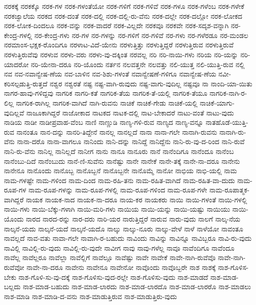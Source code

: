 {ನರಕಕ್ಕೆ
ನರಕಕ್ಕೊ
ನರಕ-ಗಳ
ನರಕ-ಗಳಂತೆಯೋ
ನರಕ-ಗಳಿಗೆ
ನರಕ-ಗಳಿವೆ
ನರಕ-ಗಳೂ
ನರಕ-ಗಳೆಂಬ
ನರಕ-ಗಳೇಕೆ
ನರಕಜ್ವಾಲೆಯ
ನರಕದ
ನರಕ-ದಂತೆ
ನರಕ-ದಲ್ಲಿ
ನರಕ-ದಲ್ಲಿ-ರು-ವೆನು
ನರಕ-ದಲ್ಲೇ
ನರಕ-ದಲ್ಲೋ
ನರಕ-ಲೋಕದ
ನರಕ-ಲೋಕ-ದಿಂದಲೂ
ನರಕ-ವನ್ನು
ನರಕ-ವಾದರೆ
ನರಕ-ವಿಲ್ಲದೇ
ನರಕವೂ
ನರಕವೇ
ನರಕ-ಸದೃಶ-ವನ್ನಾಗಿ
ನರ-ಕೇಂದ್ರ-ಗಳಲ್ಲಿ
ನರ-ಕೇಂದ್ರ-ಗಳು
ನರ-ಗಳ
ನರ-ಗಳನ್ನು
ನರ-ಗಳಿಗೆ
ನರ-ಗಳಿವೆ
ನರ-ಗಳು
ನರ-ಗಳೆರಡೂ
ನರ-ಮಂಡಲ
ನರಮಾಂಸ-ಭಕ್ಷಕ-ರೊಂದಿಗೂ
ನರಳಾಟ-ವಿದೆ-ಯೇನು
ನರಳುತ್ತಿತ್ತು
ನರಳುತ್ತಿದ್ದರೆ
ನರಳುತ್ತಿರುವ
ನರಳುತ್ತಿರುವೆ
ನರಳುತ್ತಿರುವೆವು
ನರಳುವ
ನರಳು-ವರು
ನರಳು-ವು-ದಕ್ಕಿಂತ
ನರವಲ್ಲ
ನರಿ
ನರಿ-ನಾಯಿ-ಗಳು
ನರಿಯ
ನರಿ-ಯನ್ನು
ನರಿ-ಯಾದರೋ
ನರಿ-ಯೇನಾ-ದರೂ
ನರಿ-ಯೊಂದು
ನರ್ತನ
ನಲವತ್ತನೇ
ನಲವತ್ತು
ನಲಿ-ಯುತ್ತ
ನಲಿ-ಯುತ್ತಿ-ರುವ
ನಲ್ಲಿ
ನವ
ನವ-ನವಾನ್ವೇಷ-ಣೆಯ
ನವ-ಬಾಳಿನ
ನವ-ಶಿಶು-ಗಳಂತೆ
ನವಾನ್ವೇಷಣೆ-ಗಳಿಗೂ
ನವಾನ್ವೇಷ-ಣೆಯ
ನವೀ-ಕರಿಸಲ್ಪಡುತ್ತಿ-ರುತ್ತದೆ
ನಶ್ವರ
ನಶ್ವರತೆ
ನಷ್ಟ
ನಷ್ಟ-ವಾಗಿ-ರುವುದು
ನಷ್ಟ-ವಾಗು-ವುದಿಲ್ಲ
ನಷ್ಟವೂ
ನಾ
ನಾಂದಿ-ಯಾ-ಯಿತು
ನಾಗರ-ಹಾವು-ಗಳಿದ್ದವು
ನಾಗರಿಕ
ನಾಗರಿ-ಕತೆ
ನಾಗರಿಕ-ತೆಯ
ನಾಗರಿಕ-ತೆ-ಯಲ್ಲಿ
ನಾಗರಿಕ-ತೆಯೂ
ನಾಗರಿಕ-ನಾಗಿ-ರ-ಲಿಲ್ಲ
ನಾಗರಿಕ-ರಾಗಿಲ್ಲ
ನಾಗರಿಕ-ವಾಗಿದೆ
ನಾಗಿ-ರುವನು
ನಾಚಿಕೆ
ನಾಚಿಕೆ-ಗೇಡು
ನಾಚಿಕೆ-ಯಲ್ಲಿ
ನಾಚಿಕೆ-ಯಾಗು-ವುದಿಲ್ಲವೆ
ನಾಜೂಕಾಗಿದ್ದರೆ
ನಾಜೋಕಾದ
ನಾಟಕದ
ನಾಟಕ-ದಲ್ಲಿ
ನಾಟ-ಬೇಕಾದರೆ
ನಾಟು-ವಂತೆ
ನಾಟು-ವುದು
ನಾಡಿಯ
ನಾಡೀ
ನಾಡೀಪ್ರವಾಹ-ವೆಂಬ
ನಾಣಿ
ನಾಣ್ಣುಡಿ
ನಾಣ್ಯ-ಗಳಿ-ರುವ
ನಾಣ್ಯದ
ನಾಣ್ಯ-ವನ್ನೂ
ನಾತಹೊಡೆ-ಯುತ್ತಿ-ರುವ
ನಾನಂತೂ
ನಾನ-ದನ್ನು
ನಾನರಿ-ತಿದ್ದೇನೆ
ನಾನಲ್ಲ
ನಾನಲ್ಲದೆ
ನಾನಾ
ನಾನಾ-ಗಲೇ
ನಾನಾಗಿ-ರುವನು
ನಾನಾಗಿ-ರು-ವೆನು
ನಾನಾ-ದರೊ
ನಾನಾ-ವಾಗಲೂ
ನಾನಿಂದು
ನಾನಿ-ದನ್ನು
ನಾನಿದ್ದೆ
ನಾನಿದ್ದೆನು
ನಾನಿ-ರು-ವು-ದ-ರಿಂದ
ನಾನಿ-ರುವೆ
ನಾನಿ-ರು-ವೆನು
ನಾನಿಲ್ಲ
ನಾನಿಲ್ಲದೆ
ನಾನೀಗ
ನಾನು
ನಾನೂ
ನಾನೂರು
ನಾನೆ
ನಾನೆಂದಿಗೂ
ನಾನೆಂದೂ
ನಾನೆಂಬ
ನಾನೆಂಬು-ದಿದೆ
ನಾನೆಂಬುದು
ನಾನೆ-ಣಿ-ಸುವೆನು
ನಾನೆಷ್ಟು
ನಾನೇ
ನಾನೇಕೆ
ನಾನೇ-ತಕ್ಕೆ
ನಾನೇ-ನಾ-ದರೂ
ನಾನೇನು
ನಾನೇನೂ
ನಾನೊಂದು
ನಾನೊಬ್ಬ
ನಾನೊಬ್ಬನೆ
ನಾನೊಬ್ಬನೇ
ನಾನೊಮ್ಮೆ
ನಾನೋ
ನಾಭಿಯ
ನಾಭಿ-ಯಲ್ಲಿ
ನಾಮ
ನಾಮ-ಗಳಷ್ಟೇ
ನಾಮ-ಗಳಿಂದ
ನಾಮ-ದಿಂದ
ನಾಮ-ರಹಿ-ತನು
ನಾಮ-ರಹಿತ-ವಾಗಿದೆ
ನಾಮ-ರಹಿತ-ವಾ-ದುದು
ನಾಮ-ರೂಪ-ಗಳ
ನಾಮ-ರೂಪ-ಗಳನ್ನು
ನಾಮ-ರೂಪ-ಗಳಲ್ಲಿ
ನಾಮ-ರೂಪ-ಗಳಿಂದ
ನಾಮ-ರೂಪ-ಗಳೇ
ನಾಮ-ರೂಪಾತ್ಮಕ-ವಾಗಿದ್ದರೆ
ನಾಯಕ
ನಾಯಕ-ನಾದ
ನಾಯಕ-ನಾ-ದರೂ
ನಾಯ-ಕರ
ನಾಯಕರು
ನಾಯಿ
ನಾಯಿ-ಗಳಂತೆ
ನಾಯಿ-ಗಳಲ್ಲಿ
ನಾಯಿ-ಗಳು
ನಾಯಿ-ಬೆಕ್ಕು-ಗಳಾಗಿ
ನಾಯಿ-ಮರಿ-ಗಳು
ನಾಯಿಯ
ನಾಯಿ-ಯನ್ನು
ನಾಯಿ-ಯಷ್ಟು
ನಾಯಿಯು
ನಾಯಿ-ಯೊಂದು
ನಾರದ
ನಾರದ-ರನ್ನು
ನಾರ-ದರು
ನಾರಿ-ಯರ
ನಾರುತ್ತಿದ್ದರೆ
ನಾರುವ
ನಾರು-ವುದು
ನಾಲಗೆ
ನಾಲ್ಕ-ನೆಯ
ನಾಲ್ಕನೆ-ಯದು
ನಾಲ್ಕನೆ-ಯದೆ
ನಾಲ್ಕನೆ-ಯದೊ
ನಾಲ್ಕು
ನಾಲ್ಕು-ನೂರು
ನಾಲ್ಕು-ವೇಳೆ
ನಾಳೆ
ನಾಳೆಯೋ
ನಾವಂತೂ
ನಾವಲ್ಲದೆ
ನಾವ-ವತು
ನಾವಾ-ಗಲೇ
ನಾವಾಗಿ-ರ-ಬಹುದು
ನಾವಿಂದು
ನಾವಿನ್ನು
ನಾವಿನ್ನೂ
ನಾವಿಬ್ಬರೂ
ನಾವಿ-ರು-ವುದು
ನಾವಿಲ್ಲಿ
ನಾವಿಲ್ಲಿ-ರು-ವುದು
ನಾವಿಲ್ಲಿ-ರು-ವುದೇ
ನಾವೀಗ
ನಾವು
ನಾವು-ಗಳೆಲ್ಲ
ನಾವೂ
ನಾವೆಂದಿಗೂ
ನಾವೆಂದೂ
ನಾವೆಲ್ಲ
ನಾವೆಲ್ಲರೂ
ನಾವೆಲ್ಲಾ
ನಾವೆಲ್ಲಿಗೆ
ನಾವೆಲ್ಲೂ
ನಾವೆಷ್ಟು
ನಾವೇ
ನಾವೇಕೆ
ನಾವೇ-ನಾಗಿ-ರುವೆವೊ
ನಾವೇ-ನಾಗಿ-ರುವೆವೋ
ನಾವೇ-ನಾ-ದರೂ
ನಾವೇನು
ನಾವೇನೂ
ನಾವೇನೋ
ನಾವೊಂದು
ನಾವೊಬ್ಬರೇ
ನಾಶ
ನಾಶಕ್ಕೆ
ನಾಶ-ಗೊಳಿಸ-ಬೇಕು
ನಾಶ-ಗೊಳಿ-ಸು-ವು-ದಕ್ಕೆ
ನಾಶ-ಗೊಳಿಸು-ವುದ-ರಲ್ಲೇ
ನಾಶ-ಗೊಳಿಸು-ವುದು
ನಾಶ-ಮಾಡದೆ
ನಾಶ-ಮಾಡ-ಬಲ್ಲದು
ನಾಶ-ಮಾಡ-ಬಹುದು
ನಾಶ-ಮಾಡ-ಲಾರದು
ನಾಶ-ಮಾಡ-ಲಾರದೊ
ನಾಶ-ಮಾಡ-ಲಾರರೊ
ನಾಶ-ಮಾಡಲು
ನಾಶ-ಮಾಡಿ
ನಾಶ-ಮಾಡಿ-ದ-ವನು
ನಾಶ-ಮಾಡುತ್ತಿರುವ
ನಾಶ-ಮಾಡುತ್ತಿರು-ವುದು
}

